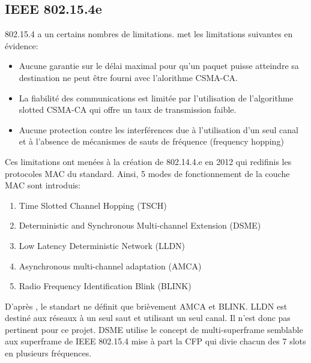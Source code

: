 \subsection*{IEEE 802.15.4e}
    802.15.4 a un certains nombres de limitations. \cite{paper:802.15.4e-survey} met les limitations suivantes en évidence:
    \begin{itemize}
      \item Aucune garantie sur le délai maximal pour qu'un paquet puisse atteindre sa destination
        ne peut être fourni avec l'alorithme CSMA-CA.
      \item La fiabilité des communications est limitée par l'utilisation de l'algorithme slotted   CSMA-CA qui offre un taux de transmission faible.
      \item Aucune protection contre les interférences due à l'utilisation d'un seul canal et à     l'absence de mécanismes de sauts de fréquence (frequency hopping)
    \end{itemize}
    Ces limitations ont menées à la création de 802.14.4.e en 2012 qui redifinis les protocoles MAC du  standard.
    Ainsi, 5 modes de fonctionnement de la couche MAC sont introduis:
    \begin{enumerate}
      \item Time Slotted Channel Hopping (TSCH)
      \item Deterministic and Synchronous Multi-channel Extension (DSME)
      \item Low Latency Deterministic Network (LLDN)
      \item Asynchronous multi-channel adaptation (AMCA)
      \item Radio Frequency Identification Blink (BLINK)
    \end{enumerate}
    D'après \cite{paper:802.15.4e-survey}, le standart ne définit que brièvement AMCA et BLINK.
    LLDN est destiné aux réseaux à un seul saut et utilisant un seul canal. Il n'est donc pas pertinent pour ce projet. DSME utilise le concept de multi-superframe semblable aux superframe de IEEE 802.15.4 mise à part la CFP qui divie chacun des 7 slots en plusieurs fréquences.


